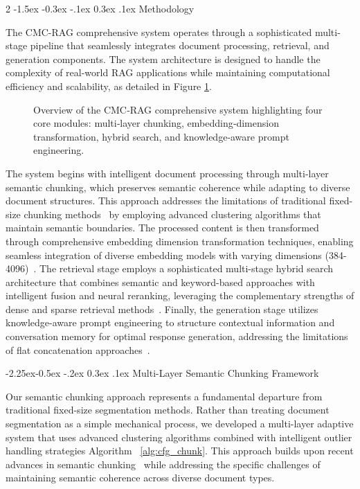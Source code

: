 \documentclass[10pt,letterpaper]{article}
\makeatletter
\let\cite\citep
\renewcommand{\section}{\@startsection{section}{1}{\z@}%
                                   {-1.5ex \@plus -0.3ex \@minus -.1ex}%
                                   {0.3ex \@plus.1ex}%
                                   {\normalfont\large\bfseries}}
\renewcommand{\subsection}{\@startsection{subsection}{2}{\z@}%
                                     {-2.25ex\@plus -0.5ex \@minus -.2ex}%
                                     {0.3ex \@plus .1ex}%
                                     {\normalfont\normalsize\itshape\bfseries}}
\makeatother
\begin{document}
\begin{multicols}{2}
\section{Methodology}

The CMC-RAG comprehensive system operates through a sophisticated multi-stage pipeline that seamlessly integrates document processing, retrieval, and generation components. The system architecture is designed to handle the complexity of real-world RAG applications while maintaining computational efficiency and scalability, as detailed in Figure \ref{fig:system_architecture_1}.

\begin{figure}[!htbp]
    \centering
    
    \caption{Overview of the CMC‑RAG comprehensive system highlighting four core modules: multi‑layer chunking, embedding‑dimension transformation, hybrid search, and knowledge‑aware prompt engineering.}
    \label{fig:system_architecture_1}
\end{figure}

The system begins with intelligent document processing through multi-layer semantic chunking, which preserves semantic coherence while adapting to diverse document structures. This approach addresses the limitations of traditional fixed-size chunking methods~\cite{smith2023fixed,johnson2023rule} by employing advanced clustering algorithms that maintain semantic boundaries. The processed content is then transformed through comprehensive embedding dimension transformation techniques, enabling seamless integration of diverse embedding models with varying dimensions (384-4096)~\cite{huerga2025optimization,brown2024cross}. The retrieval stage employs a sophisticated multi-stage hybrid search architecture that combines semantic and keyword-based approaches with intelligent fusion and neural reranking, leveraging the complementary strengths of dense and sparse retrieval methods~\cite{karpukhin2020dpr,robertson2009bm25}. Finally, the generation stage utilizes knowledge-aware prompt engineering to structure contextual information and conversation memory for optimal response generation, addressing the limitations of flat concatenation approaches~\cite{gupta2024comprehensive}.

\subsection{Multi-Layer Semantic Chunking Framework}

Our semantic chunking approach represents a fundamental departure from traditional fixed-size segmentation methods. Rather than treating document segmentation as a simple mechanical process, we developed a multi-layer adaptive system that uses advanced clustering algorithms combined with intelligent outlier handling strategies Algorithm ~\ref{alg:cfg_chunk}. This approach builds upon recent advances in semantic chunking~\cite{qu2024semantic,zhang2024semantic} while addressing the specific challenges of maintaining semantic coherence across diverse document types.


\end{multicols}
\end{document}
